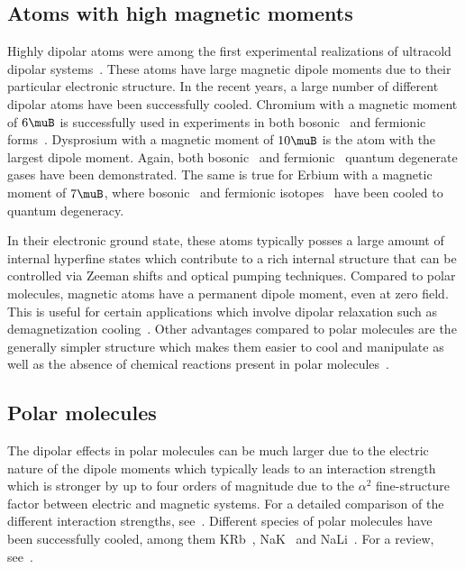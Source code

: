 \subsection{Atoms with high magnetic moments}

Highly dipolar atoms were among the first experimental realizations of ultracold dipolar
systems~\cite{Griesmaier2005a}. These atoms have large magnetic dipole moments due to their
particular electronic structure. In the recent years, a large number of different dipolar atoms
have been successfully cooled. Chromium with a magnetic moment of $6\muB$ is successfully
used in experiments in both bosonic~\cite{Griesmaier2005a,Beaufils2008} and fermionic
forms~\cite{Naylor2015}. Dysprosium with a magnetic moment of $10\muB$ is the atom with the largest
dipole moment. Again, both bosonic~\cite{Lu2011} and fermionic~\cite{Lu2012} quantum degenerate
gases have been demonstrated. The same is true for Erbium with a magnetic moment of $7\muB$, where
bosonic~\cite{Aikawa2012} and fermionic isotopes~\cite{Aikawa2014} have been cooled to quantum
degeneracy.

In their electronic ground state, these atoms typically posses a large amount of internal hyperfine
states which contribute to a rich internal structure that can be controlled via Zeeman shifts
and optical pumping techniques. Compared to polar molecules, magnetic atoms have a permanent
dipole moment, even at zero field. This is useful for certain applications which involve dipolar
relaxation such as demagnetization cooling~\cite{Hensler2003,Fattori2006,Volchkov2013}. Other
advantages compared to polar molecules are the generally simpler structure which makes them easier
to cool and manipulate as well as the absence of chemical reactions present in polar
molecules~\cite{Ospelkaus2010a,Quemener2012}.

\subsection{Polar molecules}

The dipolar effects in polar molecules can be much larger due to the
electric nature of the dipole moments which typically leads to an interaction strength which
is stronger by up to four orders of magnitude due to the $\alpha^2$ fine-structure factor between electric
and magnetic systems. For a detailed comparison of the different interaction strengths,
see~\cite{Lahaye2009}. Different species of polar molecules have been successfully cooled, among
them KRb~\cite{Ni2008b,Ospelkaus2010}, NaK~\cite{Wu2012a} and NaLi~\cite{Heo2012}. For a review,
see~\cite{Quemener2012}.

